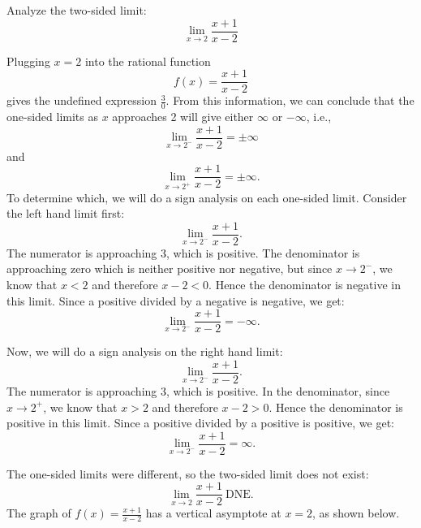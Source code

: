 \documentclass{ximera}
\begin{document}
\begin{example}[example 3]
Analyze the two-sided limit:
\[
\lim_{x\to 2} 
\frac{x + 1}{x-2}
\]

Plugging $x = 2$ into the rational function
\[f(x) = \frac{x + 1}{x-2}\]
gives the undefined expression $\frac{3}{0}$. From this information, we can conclude that the 
one-sided limits as $x$ approaches 2
will give either $\infty$ or $-\infty$, i.e., 
\[\lim_{x \to 2^-} \frac{x+1}{x-2}= \pm \infty\]
and
\[\lim_{x \to 2^+} \frac{x+1}{x-2}= \pm \infty.\]
To determine which, we will do a sign analysis on each one-sided limit. Consider the left hand limit first:
\[\lim_{x \to 2^-} \frac{x+1}{x-2}.\]
The numerator is approaching 3, which is positive. The denominator is approaching zero which is neither 
positive nor negative, but since $x \to 2^-$, we know that $x<2$ and therefore $x-2 <0$.  
Hence the denominator is negative in this limit. Since a positive divided by a 
negative is negative, we get:
\[\lim_{x \to 2^-} \frac{x+1}{x-2}  = -\infty.\]

Now, we will do a sign analysis on the right hand limit:
\[\lim_{x \to 2^-} \frac{x+1}{x-2}.\]
The numerator is approaching 3, which is positive. In the denominator, since $x \to 2^+$, 
we know that $x>2$ and therefore $x-2 >0$.  
Hence the denominator is positive in this limit. Since a positive divided by a 
positive is positive, we get:
\[\lim_{x \to 2^-} \frac{x+1}{x-2} = \infty.\]

The one-sided limits were different, so the two-sided limit does not exist:
\[\lim_{x \to 2} \frac{x+1}{x-2} \ \text{DNE}.\]
The graph of $f(x) = \frac{x+1}{x-2}$ has a vertical asymptote at $x = 2$, as shown below.

\begin{center}
\end{center}
\end{example}
\end{document}
